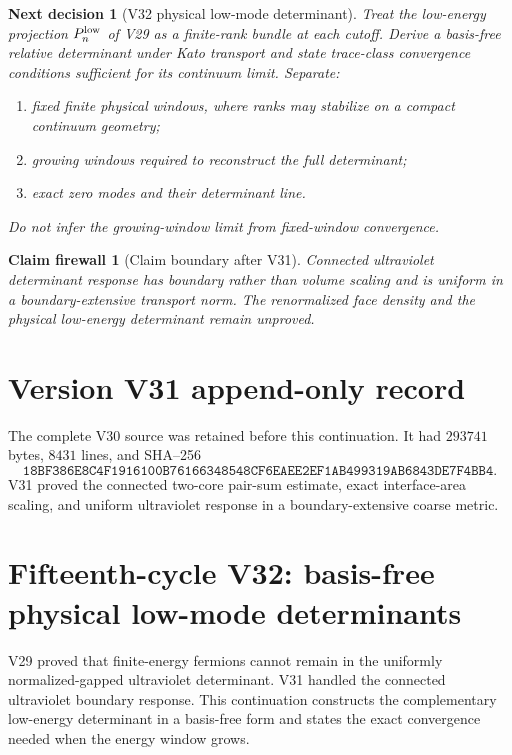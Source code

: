 \documentclass[11pt]{article}
\newtheorem{firewall}[theorem]{Claim firewall}
\newtheorem{decision}[theorem]{Next decision}
\theoremstyle{remark}
\begin{document}
\begin{decision}[V32 physical low-mode determinant]
\label{dec:v15v31-next}
Treat the low-energy projection \(P_n^{\rm low}\) of V29 as a
finite-rank bundle at each cutoff.  Derive a basis-free relative
determinant under Kato transport and state trace-class convergence
conditions sufficient for its continuum limit.  Separate:
\begin{enumerate}
\item fixed finite physical windows, where ranks may stabilize on a
      compact continuum geometry;
\item growing windows required to reconstruct the full determinant;
\item exact zero modes and their determinant line.
\end{enumerate}
Do not infer the growing-window limit from fixed-window convergence.
\end{decision}

\begin{firewall}[Claim boundary after V31]
\label{fire:v15v31}
Connected ultraviolet determinant response has boundary rather than
volume scaling and is uniform in a boundary-extensive transport
norm.  The renormalized face density and the physical low-energy
determinant remain unproved.
\end{firewall}

\section*{Version V31 append-only record}
The complete V30 source was retained before this continuation.  It
had \(293741\) bytes, \(8431\) lines, and SHA--256
\[
 \texttt{18BF386E8C4F1916100B76166348548CF6EAEE2EF1AB499319AB6843DE7F4BB4}.
\]
V31 proved the connected two-core pair-sum estimate, exact
interface-area scaling, and uniform ultraviolet response in a
boundary-extensive coarse metric.
\section{Fifteenth-cycle V32: basis-free physical low-mode determinants}
\label{sec:v15v32}

V29 proved that finite-energy fermions cannot remain in the
uniformly normalized-gapped ultraviolet determinant.  V31 handled
the connected ultraviolet boundary response.  This continuation
constructs the complementary low-energy determinant in a
basis-free form and states the exact convergence needed when the
energy window grows.
\end{document}

